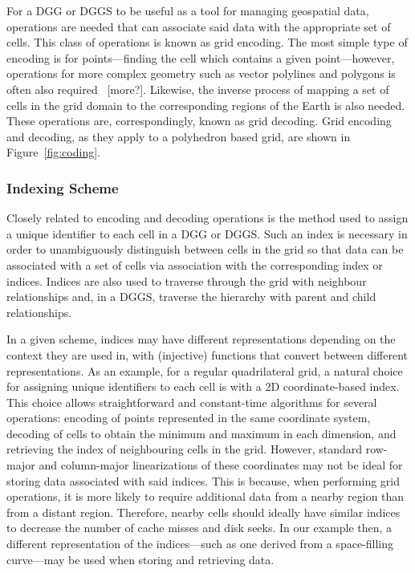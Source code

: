 For a DGG or DGGS to be useful as a tool for managing geospatial data, operations are needed that can associate said data with the appropriate set of cells.
This class of operations is known as grid encoding.
The most simple type of encoding is for points---finding the cell which contains a given point---however, operations for more complex geometry such as vector polylines and polygons is often also required~\cite{du2018duality} [more?].
Likewise, the inverse process of mapping a set of cells in the grid domain to the corresponding regions of the Earth is also needed.
These operations are, correspondingly, known as grid decoding.
Grid encoding and decoding, as they apply to a polyhedron based grid, are shown in Figure~\ref{fig:coding}.


\subsubsection{Indexing Scheme} \label{sec::dggs:indexing}
Closely related to encoding and decoding operations is the method used to assign a unique identifier to each cell in a DGG or DGGS.
Such an index is necessary in order to unambiguously distinguish between cells in the grid so that data can be associated with a set of cells via association with the corresponding index or indices.
Indices are also used to traverse through the grid with neighbour relationships and, in a DGGS, traverse the hierarchy with parent and child relationships.


In a given scheme, indices may have different representations depending on the context they are used in, with (injective) functions that convert between different representations.
As an example, for a regular quadrilateral grid, a natural choice for assigning unique identifiers to each cell is with a 2D coordinate-based index.
This choice allows straightforward and constant-time algorithms for several operations: encoding of points represented in the same coordinate system, decoding of cells to obtain the minimum and maximum in each dimension, and retrieving the index of neighbouring cells in the grid.
However, standard row-major and column-major linearizations of these coordinates may not be ideal for storing data associated with said indices.
This is because, when performing grid operations, it is more likely to require additional data from a nearby region than from a distant region.
Therefore, nearby cells should ideally have similar indices to decrease the number of cache misses and disk seeks.
In our example then, a different representation of the indices---such as one derived from a space-filling curve---may be used when storing and retrieving data.


